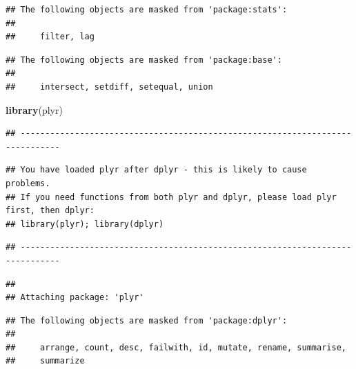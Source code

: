 \documentclass[]{article}
\newenvironment{Shaded}{\begin{snugshade}}{\end{snugshade}}
\newcommand{\CommentTok}[1]{\textcolor[rgb]{0.56,0.35,0.01}{\textit{#1}}}
\newcommand{\KeywordTok}[1]{\textcolor[rgb]{0.13,0.29,0.53}{\textbf{#1}}}
\newcommand{\NormalTok}[1]{#1}
\newcommand{\OperatorTok}[1]{\textcolor[rgb]{0.81,0.36,0.00}{\textbf{#1}}}
\newcommand{\StringTok}[1]{\textcolor[rgb]{0.31,0.60,0.02}{#1}}
\begin{document}
\begin{verbatim}
## The following objects are masked from 'package:stats':
## 
##     filter, lag
\end{verbatim}

\begin{verbatim}
## The following objects are masked from 'package:base':
## 
##     intersect, setdiff, setequal, union
\end{verbatim}

\begin{Shaded}
\begin{Highlighting}[]
\KeywordTok{library}\NormalTok{(plyr)}
\end{Highlighting}
\end{Shaded}

\begin{verbatim}
## ------------------------------------------------------------------------------
\end{verbatim}

\begin{verbatim}
## You have loaded plyr after dplyr - this is likely to cause problems.
## If you need functions from both plyr and dplyr, please load plyr first, then dplyr:
## library(plyr); library(dplyr)
\end{verbatim}

\begin{verbatim}
## ------------------------------------------------------------------------------
\end{verbatim}

\begin{verbatim}
## 
## Attaching package: 'plyr'
\end{verbatim}

\begin{verbatim}
## The following objects are masked from 'package:dplyr':
## 
##     arrange, count, desc, failwith, id, mutate, rename, summarise,
##     summarize
\end{verbatim}

\begin{Shaded}
\end{Shaded}
\end{document}
